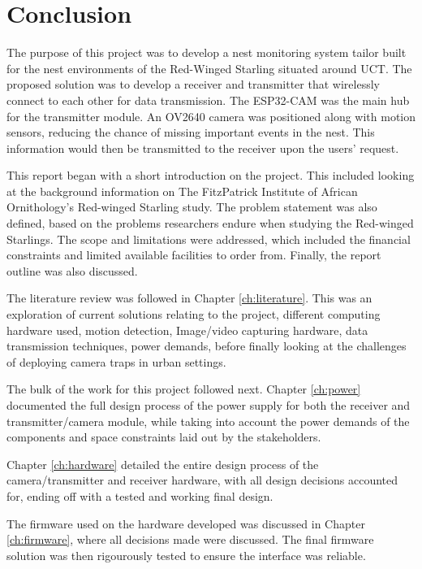 \documentclass[class=report,11pt,crop=false]{standalone}
\begin{document}
\chapter{Conclusion \label{ch:conclusions}}

The purpose of this project was to develop a nest monitoring system tailor built for the nest environments of the Red-Winged Starling situated around UCT. The proposed solution was to develop a receiver and transmitter that wirelessly connect to each other for data transmission. The ESP32-CAM was the main hub for the transmitter module. An OV2640 camera was positioned along with motion sensors, reducing the chance of missing important events in the nest. This information would then be transmitted to the receiver upon the users' request. 

This report began with a short introduction on the project. This included looking at the background information on The FitzPatrick Institute of African Ornithology's Red-winged Starling study. The problem statement was also defined, based on the problems researchers endure when studying the Red-winged Starlings. The scope and limitations were addressed, which included the financial constraints and limited available facilities to order from. Finally, the report outline was also discussed. 

The literature review was followed in Chapter \ref{ch:literature}. This was an exploration of current solutions relating to the project, different computing hardware used, motion detection, Image/video capturing hardware, data transmission techniques, power demands, before finally looking at the challenges of deploying camera traps in urban settings. 

The bulk of the work for this project followed next. Chapter \ref{ch:power} documented the full design process of the power supply for both the receiver and transmitter/camera module, while taking into account the power demands of the components and space constraints laid out by the stakeholders. 

Chapter \ref{ch:hardware} detailed the entire design process of the camera/transmitter and receiver hardware, with all design decisions accounted for, ending off with a tested and working final design. 

The firmware used on the hardware developed was discussed in Chapter \ref{ch:firmware}, where all decisions made were discussed. The final firmware solution was then rigourously tested to ensure the interface was reliable. 
\end{document}
